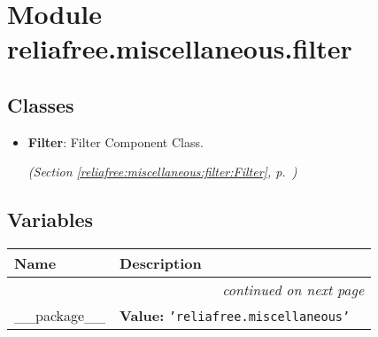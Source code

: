 %
%
%


\section{Module reliafree.miscellaneous.filter}

    \label{reliafree:miscellaneous:filter}


\subsection{Classes}

\begin{itemize}  \setlength{\parskip}{0ex}
  \item \textbf{Filter}: Filter Component Class.



  \textit{(Section \ref{reliafree:miscellaneous:filter:Filter}, p.~\pageref{reliafree:miscellaneous:filter:Filter})}

\end{itemize}


  \subsection{Variables}

    \vspace{-1cm}
\hspace{\varindent}\begin{longtable}{|p{\varnamewidth}|p{\vardescrwidth}|l}
\cline{1-2}
\cline{1-2} \centering \textbf{Name} & \centering \textbf{Description}& \\
\cline{1-2}
\endhead\cline{1-2}\multicolumn{3}{r}{\small\textit{continued on next page}}\\\endfoot\cline{1-2}
\endlastfoot\raggedright \_\-\_\-p\-a\-c\-k\-a\-g\-e\-\_\-\_\- & \raggedright \textbf{Value:} 
{\tt \texttt{'}\texttt{reliafree.miscellaneous}\texttt{'}}&\\
\cline{1-2}
\end{longtable}

